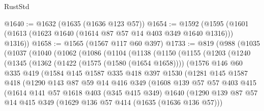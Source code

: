 \begin{lexlean}{RustStd}
\begin{coremodule}
@1640 := @1632 (@1635 (@1636 @123 @57))
@1654 := @1592 (@1595 (@1601 (@1613 (@1623 @1640 (@1614 @87 @57 @14 @403 @349 @1640 @1316))) @1316))
@1658 := @1565 (@1567 @117 @60 @397)
@1733 := @819
    (@988
      (@1035
        (@1037
          (@1040
            (@1062
              (@1086
                (@1104
                  (@1138
                    (@1150
                      (@1155
                        (@1203
                          (@1240
                            (@1345
                              (@1362
                                (@1422 (@1575 (@1580 (@1654 @1658))))
                                (@1576
                                  @146
                                  @60
                                  @335
                                  @419
                                  (@1584
                                    @145
                                    @1587
                                    @335
                                    @418
                                    @397
                                    @1530
                                    (@1281
                                      @145
                                      @1587
                                      @418
                                      (@1290
                                        @143
                                        @87
                                        @59
                                        @14
                                        @416
                                        @349
                                        (@1608
                                          @139
                                          @57
                                          @57
                                          @403
                                          @415
                                          (@1614
                                            @141
                                            @57
                                            @1618
                                            @403
                                            (@345 @415 @349)
                                            @1640
                                            (@1290
                                              @139
                                              @87
                                              @57
                                              @14
                                              @415
                                              @349
                                              (@1629 @136 @57 @414 (@1635 (@1636 @136 @57)))

\end{coremodule}
\end{lexlean}
